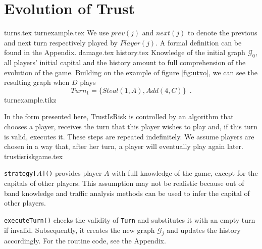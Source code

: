 \section{Evolution of Trust}
  {turns.tex}
  {turnexample.tex}
  We use $prev\left(j\right)$ and $next\left(j\right)$ to denote the previous and next turn respectively played by
  $Player(j)$. A formal definition can be found in the Appendix.
  {damage.tex}
  {history.tex}
  Knowledge of the initial graph $\mathcal{G}_0$, all players' initial capital and the history amount to full comprehension of
  the evolution of the game. Building on the example of figure \ref{fig:utxo}, we can see the resulting graph when $D$ plays
  \begin{equation}
  \label{turnexample}
    Turn_1 = \{Steal\left(1, A\right), Add\left(4, C\right)\} \enspace.
  \end{equation}
  {turnexample.tikz}

  In the form presented here, TrustIsRisk is controlled by an algorithm that chooses a player, receives the turn that
  this player wishes to play and, if this turn is valid, executes it. These steps are repeated indefinitely. We assume
  players are chosen in a way that, after her turn, a player will eventually play again later.
  {trustisriskgame.tex}

  \texttt{strategy[}$A$\texttt{]()} provides player $A$ with full knowledge of the game, except for the capitals of other
  players. This assumption may not be realistic because out of band knowledge and traffic analysis methods can be used to
  infer the capital of other players.

  \texttt{executeTurn()} checks the validity of \texttt{Turn} and substitutes it with an empty turn if invalid.
  Subsequently, it creates the new graph $\mathcal{G}_j$ and updates the history accordingly. For the routine code,
  see the Appendix.
